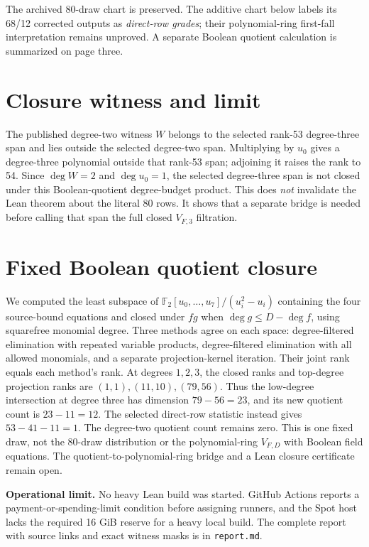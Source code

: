 \documentclass[10pt]{article}
\begin{document}
\noindent The archived 80-draw chart is preserved. The additive chart below
labels its 68/12 corrected outputs as \emph{direct-row grades}; their
polynomial-ring first-fall interpretation remains unproved. A separate
Boolean quotient calculation is summarized on page three.

\section*{Closure witness and limit}
The published degree-two witness $W$ belongs to the selected rank-53
degree-three span and lies outside the selected degree-two span. Multiplying
by $u_0$ gives a degree-three polynomial outside that rank-53 span; adjoining
it raises the rank to 54. Since $\deg W=2$ and $\deg u_0=1$, the selected
degree-three span is not closed under this Boolean-quotient degree-budget
product. This does \emph{not} invalidate the Lean theorem about the literal
80 rows. It shows that a separate bridge is needed before calling that span
the full closed $V_{F,3}$ filtration.

\section*{Fixed Boolean quotient closure}
We computed the least subspace of $\mathbb F_2[u_0,\ldots,u_7]/(u_i^2-u_i)$
containing the four source-bound equations and closed under $fg$ when
$\deg g\leq D-\deg f$, using squarefree monomial degree. Three methods agree
on each space: degree-filtered elimination with repeated variable products,
degree-filtered elimination with all allowed monomials, and a separate
projection-kernel iteration. Their joint rank equals each method's rank.
At degrees $1,2,3$, the closed ranks and top-degree projection ranks are
$(1,1),(11,10),(79,56)$. Thus the low-degree intersection at degree three
has dimension $79-56=23$, and its new quotient count is $23-11=12$. The
selected direct-row statistic instead gives $53-41-11=1$. The degree-two
quotient count remains zero. This is one fixed draw, not the 80-draw
distribution or the polynomial-ring $V_{F,D}$ with Boolean field equations.
The quotient-to-polynomial-ring bridge and a Lean closure certificate remain
open.

\noindent\textbf{Operational limit.} No heavy Lean build was started. GitHub
Actions reports a payment-or-spending-limit condition before assigning
runners, and the Spot host lacks the required 16 GiB reserve for a heavy
local build. The complete report with source links and exact witness masks is
in \texttt{report.md}.
\end{document}
